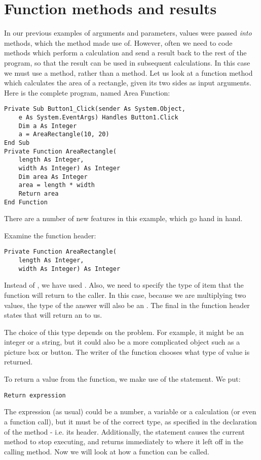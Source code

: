 	\section{Function methods and results}
		In our previous examples of arguments and parameters, values were passed \emph{into} methods, which the method made use of. However, often we need to code methods which perform a calculation and send a result back to the rest of the program, so that the result can be used in subsequent calculations. In this case we must use a  method, rather than a  method. Let us look at a function method which calculates the area of a rectangle, given its two sides as input arguments. Here is the complete program, named Area Function:
		\begin{lstlisting}
Private Sub Button1_Click(sender As System.Object,
	e As System.EventArgs) Handles Button1.Click
	Dim a As Integer
	a = AreaRectangle(10, 20)
End Sub
Private Function AreaRectangle(
	length As Integer,
	width As Integer) As Integer
	Dim area As Integer
	area = length * width
	Return area
End Function
		\end{lstlisting}
		There are a number of new features in this example, which go hand in hand.
		
		Examine the function header:
		\begin{lstlisting}
Private Function AreaRectangle(
	length As Integer,
	width As Integer) As Integer
		\end{lstlisting}

		Instead of , we have used . Also, we need to specify the type of item that the function will return to the caller. In this case, because we are multiplying two  values, the type of the answer will also be an . The final  in the function header states that  will return an  to us.

		The choice of this type depends on the problem. For example, it might be an integer or a string, but it could also be a more complicated object such as a picture box or button. The writer of the function chooses what type of value is returned.
		
		To return a value from the function, we make use of the  statement. We put:
		\begin{lstlisting}
Return expression
		\end{lstlisting}
		The expression (as usual) could be a number, a variable or a calculation (or even a function call), but it must be of the correct type, as specified in the declaration of the method - i.e. its header. Additionally, the  statement causes the current method to stop executing, and returns immediately to where it left off in the calling method. Now we will look at how a function can be called.
		
